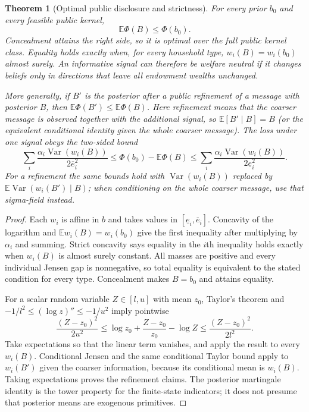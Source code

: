 \documentclass[11pt]{article}
\newtheorem{theorem}{Theorem}
\theoremstyle{remark}
\begin{document}
\begin{theorem}[Optimal public disclosure and strictness]
For every prior $b_0$ and every feasible public kernel,
\[
 \mathbb E\Phi(B)\leq\Phi(b_0).
\]
Concealment attains the right side, so it is optimal over the full public
kernel class. Equality holds exactly when, for every household type,
$w_i(B)=w_i(b_0)$ almost surely. An informative signal can therefore be
welfare neutral if it changes beliefs only in directions that leave all
endowment wealths unchanged.

More generally, if $B'$ is the posterior after a public refinement of a
message with posterior $B$, then
$\mathbb E\Phi(B')\leq\mathbb E\Phi(B)$. Here refinement means that the
coarser message is observed together with the additional signal, so
$\mathbb E[B'\mid B]=B$ (or the equivalent conditional identity given the
whole coarser message). The loss under one signal obeys the two-sided bound
\[
 \sum_i\frac{\alpha_i\operatorname{Var}(w_i(B))}{2\overline e_i^2}
 \leq \Phi(b_0)-\mathbb E\Phi(B)
 \leq
 \sum_i\frac{\alpha_i\operatorname{Var}(w_i(B))}{2\underline e_i^2}.
\]
For a refinement the same bounds hold with
$\operatorname{Var}(w_i(B))$ replaced by
$\mathbb E\operatorname{Var}(w_i(B')\mid B)$; when conditioning on the
whole coarser message, use that sigma-field instead.
\end{theorem}
\begin{proof}
Each $w_i$ is affine in $b$ and takes values in
$[\underline e_i,\overline e_i]$. Concavity of the logarithm and
$\mathbb E w_i(B)=w_i(b_0)$ give the first inequality after multiplying
by $\alpha_i$ and summing. Strict concavity says equality in the $i$th
inequality holds exactly when $w_i(B)$ is almost surely constant. All
masses are positive and every individual Jensen gap is nonnegative, so
total equality is equivalent to the stated condition for every type.
Concealment makes $B=b_0$ and attains equality.

For a scalar random variable $Z\in[l,u]$ with mean $z_0$, Taylor's theorem
and $-1/l^2\leq(\log z)''\leq-1/u^2$ imply pointwise
\[
 \frac{(Z-z_0)^2}{2u^2}
 \leq \log z_0+\frac{Z-z_0}{z_0}-\log Z
 \leq\frac{(Z-z_0)^2}{2l^2}.
\]
Take expectations so that the linear term vanishes, and apply the result
to every $w_i(B)$. Conditional Jensen and the same conditional Taylor
bound apply to $w_i(B')$ given the coarser information, because its
conditional mean is $w_i(B)$. Taking expectations proves the refinement
claims. The posterior martingale identity is the tower property for the
finite-state indicators; it does not presume that posterior means are
exogenous primitives.
\end{proof}
\end{document}
